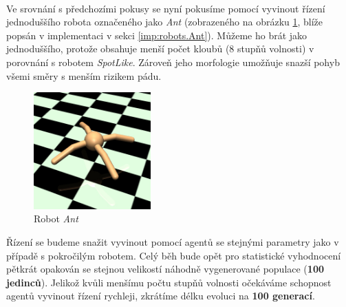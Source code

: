 \paragraph{}
Ve srovnání s předchozími pokusy se nyní pokusíme pomocí vyvinout řízení
jednoduššího robota označeného jako \emph{Ant} (zobrazeného na obrázku
\ref{fig:robot:ant}, blíže popsán v implementaci v sekci \ref{imp:robots.Ant}).
Můžeme ho brát jako jednoduššího, protože obsahuje menší počet kloubů (8 stupňů
volnosti) v porovnání s robotem \emph{SpotLike}. Zároveň jeho morfologie
umožňuje snazší pohyb všemi směry s menším rizikem pádu.

\begin{figure}[!htb]
    \centering
    \includegraphics[width=0.4\textwidth]{../img/crop_Ant-v3.jpg}
    \caption{Robot \emph{Ant}}
    \label{fig:robot:ant}
\end{figure}

Řízení se budeme snažit vyvinout pomocí agentů se stejnými parametry jako v
případě s pokročilým robotem. Celý běh bude opět pro statistické vyhodnocení
pětkrát opakován se stejnou velikostí náhodně vygenerované populace
(\textbf{100 jedinců}). Jelikož kvůli menšímu počtu stupňů volnosti očekáváme
schopnost agentů vyvinout řízení rychleji, zkrátíme délku evoluci na
\textbf{100 generací}.

